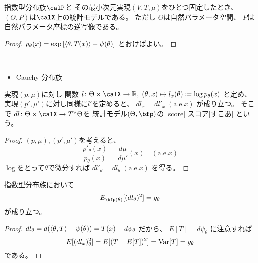 \documentclass[report]{jlreq}
\begin{document}
\begin{proposition}
    指数型分布族$\calP$と
    その最小次元実現$(V, T, \mu)$をひとつ固定したとき、
    $(\Theta, P)$は$\calX$上の統計モデルである。
    ただし
    $\Theta$は自然パラメータ空間、
    $P$は自然パラメータ座標の逆写像である。
\end{proposition}

\begin{proof}
    $p_\theta(x) = \exp \left[{ \left\langle{\theta},{T(x)}\right\rangle - \psi(\theta) }\right]$
    とおけばよい。
\end{proof}

\begin{example}[統計モデルの例]
    ~
    \begin{itemize}
        \item Cauchy 分布族
    \end{itemize}
\end{example}

\begin{propdef}[スコア関数]
    実現$(p, \mu)$に対し
    関数
    $l \colon \Theta \times \calX \to \R,
        \; (\theta, x) \mapsto l_x(\theta) \coloneqq \log p_\theta(x)$
    と定め、
    実現$(p', \mu')$に対し同様に$l'$を定めると、
    $dl_x = dl'_x \; (\text{a.e.$x$})$
    が成り立つ。
    そこで
    $dl \colon \Theta \times \calX \to T^\vee \Theta$を
    統計モデル$(\Theta, \bfp)$の
    [score]
        {スコア}[すこあ]
    という。
\end{propdef}

\begin{proof}
    $(p, \mu), (p', \mu')$を考えると、
    \begin{equation}
        \frac{p'_\theta(x)}{p_\theta(x)}
            =
                \frac{d\mu}{d\mu'}(x)
                \quad
                (\text{a.e.$x$})
    \end{equation}
    $\log$をとって$\theta$で微分すれば
    $dl'_\theta = dl_\theta \; (\text{a.e.$x$})$
    を得る。
\end{proof}

\begin{proposition}
    指数型分布族において
    \begin{equation}
        E_{\bfp(\theta)}[(dl_\theta)^2]
            =
                g_\theta
    \end{equation}
    が成り立つ。
\end{proposition}

\begin{proof}
    $dl_\theta = d(\left\langle{\theta},{T}\right\rangle - \psi(\theta)) = T(x) - d\psi_\theta$
    だから、
    $E[T] = d\psi_\theta$
    に注意すれば
    \begin{equation}
        E[(dl_x)_\theta^2]
            =
                E[(T - E[T])^2]
            =
                \operatorname{Var}[T]
            =
                g_\theta
    \end{equation}
    である。
\end{proof}
\end{document}
